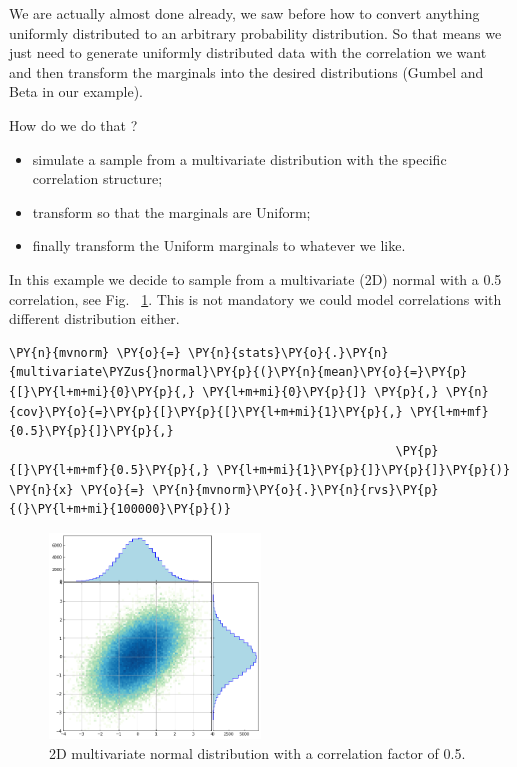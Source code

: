 We are actually almost done already, we saw before how to convert
anything uniformly distributed to an arbitrary probability distribution.
So that means we just need to generate uniformly distributed data with the
correlation we want and then transform the marginals into the desired
distributions (Gumbel and Beta in our example).

How do we do that ?

\begin{itemize}
\tightlist
\item
  simulate a sample from a multivariate distribution with the specific correlation structure;
\item
  transform so that the marginals are Uniform;
\item
  finally transform the Uniform marginals to whatever we like.
\end{itemize}


In this example we decide to sample from a multivariate (2D) normal with a 0.5 correlation, 
see Fig.~ \ref{fig:multivariate_with_correlation}.
This is not mandatory we could model correlations with different distribution either.

\begin{tcolorbox}[breakable, size=fbox, boxrule=1pt, pad at break*=1mm,colback=cellbackground, colframe=cellborder]
\begin{Verbatim}[commandchars=\\\{\}]
\PY{n}{mvnorm} \PY{o}{=} \PY{n}{stats}\PY{o}{.}\PY{n}{multivariate\PYZus{}normal}\PY{p}{(}\PY{n}{mean}\PY{o}{=}\PY{p}{[}\PY{l+m+mi}{0}\PY{p}{,} \PY{l+m+mi}{0}\PY{p}{]} \PY{p}{,} \PY{n}{cov}\PY{o}{=}\PY{p}{[}\PY{p}{[}\PY{l+m+mi}{1}\PY{p}{,} \PY{l+m+mf}{0.5}\PY{p}{]}\PY{p}{,}
                                                      \PY{p}{[}\PY{l+m+mf}{0.5}\PY{p}{,} \PY{l+m+mi}{1}\PY{p}{]}\PY{p}{]}\PY{p}{)}
\PY{n}{x} \PY{o}{=} \PY{n}{mvnorm}\PY{o}{.}\PY{n}{rvs}\PY{p}{(}\PY{l+m+mi}{100000}\PY{p}{)}
\end{Verbatim}
\end{tcolorbox}

\begin{figure}[htb]
  \centering
  \includegraphics[width=0.5\textwidth]{figures/lesson6_14_0.png}
  \caption{2D multivariate normal distribution with a correlation factor of 0.5.}
  \label{fig:multivariate_with_correlation}
\end{figure}
    
